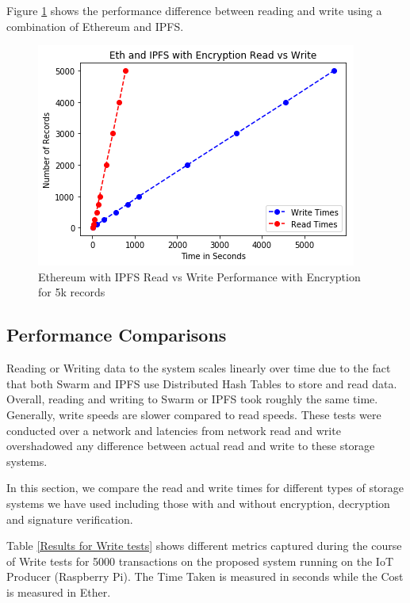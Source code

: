 \documentclass[11pt,openright]{report}
\begin{document}
Figure \ref{fig:graph_eth_ipfs_readvwrite_wencr} shows the performance difference between reading and write using a combination of Ethereum and IPFS.

\begin{figure}
    \centering
    \includegraphics[scale=1]{results/graphs/Eth_IPFS_Read_v_Write_Encr.png}
    \caption{Ethereum with IPFS Read vs Write Performance with Encryption for 5k records}
    \label{fig:graph_eth_ipfs_readvwrite_wencr}
\end{figure}

\subsection{Performance Comparisons}
Reading or Writing data to the system scales linearly over time due to the fact that both Swarm and IPFS use Distributed Hash Tables to store and read data. Overall, reading and writing to Swarm or IPFS took roughly the same time. Generally, write speeds are slower compared to read speeds. These tests were conducted over a network and latencies from network read and write overshadowed any difference between actual read and write to these storage systems.

In this section, we compare the read and write times for different types of storage systems we have used including those with and without encryption, decryption and signature verification.

Table \ref{Results for Write tests} shows different metrics captured during the course of Write tests for 5000 transactions on the proposed system running on the IoT Producer (Raspberry Pi). The Time Taken is measured in seconds while the Cost is measured in Ether. 
\end{document}
